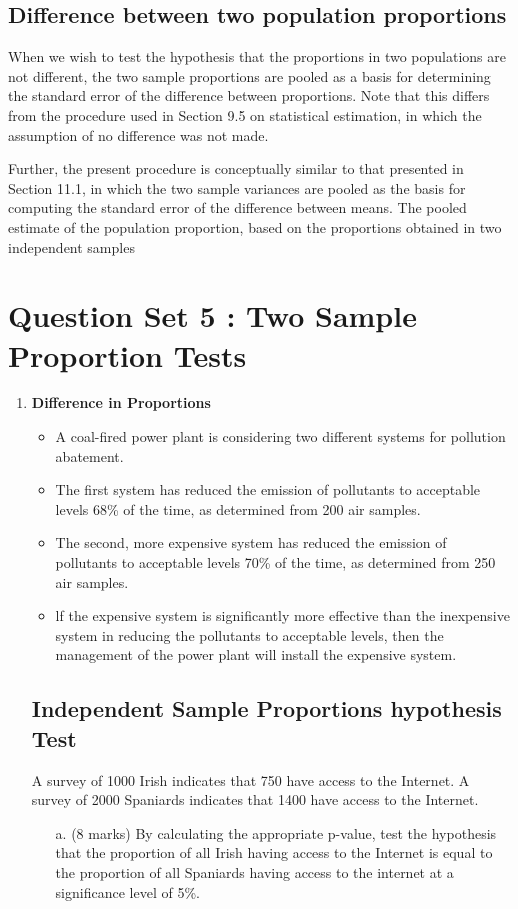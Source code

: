 \documentclass[]{report}
\begin{document}
\begin{enumerate}



\subsection{Difference between two population proportions}
When we wish to test the hypothesis that the proportions in two
populations are not different, the two sample proportions are
pooled as a basis for determining the standard error of the
difference between proportions. Note that this differs from the
procedure used in Section 9.5 on statistical estimation, in which
the assumption of no difference was not made.

Further, the present procedure is conceptually similar to that
presented in Section 11.1, in which the two sample variances are
pooled as the basis for computing the standard error of the
difference between means. The pooled estimate of the population
proportion, based on the proportions obtained in two independent
samples

\newpage
\section{Question Set 5 : Two Sample Proportion Tests}
\begin{enumerate}
\item \textbf{Difference in Proportions} 
\begin{itemize}
\item A coal-fired power plant is considering two different systems for pollution abatement. 
\item The first system has reduced the emission of pollutants to acceptable levels 68\% of the time, as determined from 200 air samples.
\item  The second, more expensive system has reduced the emission of
pollutants to acceptable levels 70\% of the time, as determined from 250 air samples. 
\item lf the expensive system is significantly more effective than the inexpensive system in reducing the pollutants to acceptable levels, then the management of the power plant will install the expensive system.
\end{itemize}



\subsection{Independent Sample Proportions hypothesis Test }
A survey of 1000 Irish indicates that 750 have access to the Internet. A survey of 2000 Spaniards
indicates that 1400 have access to the Internet.
\begin{itemize}
\item[a.] (8 marks) By calculating the appropriate p-value, test the hypothesis that the proportion of all Irish
having access to the Internet is equal to the proportion of all Spaniards having access to the
internet at a significance level of 5\%.


\end{itemize}
\end{enumerate}
\end{enumerate}
\end{document}
